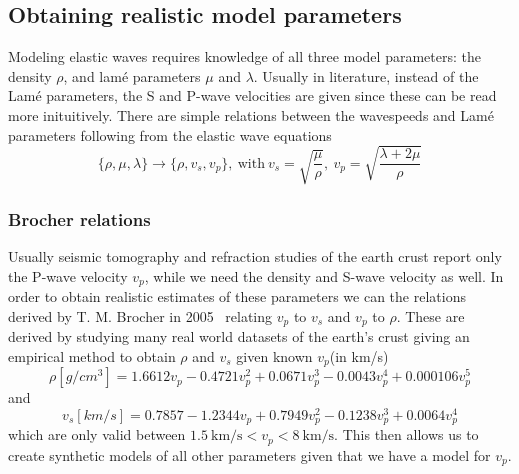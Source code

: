 \documentclass[10pt]{SelfArx} %
\theoremstyle{definition}
\begin{document}
\subsection{Obtaining realistic model parameters}
Modeling elastic waves requires knowledge of all three model parameters: the density $\rho$, and lamé parameters $\mu$ and $\lambda$.
Usually in literature, instead of the Lamé parameters, the S and P-wave velocities are given since these can be read more inituitively. There are simple relations between the wavespeeds and Lamé parameters following from the elastic wave equations 
\begin{equation}\label{eq:conversion_lame_to_velocity}
\{\rho, \mu, \lambda\} \rightarrow \{\rho, v_s, v_p\}, \ \text{with} \ v_s=\sqrt{\frac{\mu}{\rho}}, \ v_p = \sqrt{\frac{\lambda+2\mu}{\rho}} 
\end{equation}
\subsubsection{Brocher relations}
Usually seismic tomography and refraction studies of the earth crust report only the P-wave velocity $v_p$, while we need the density and S-wave velocity as well.
 In order to obtain realistic estimates of these parameters we can the relations derived by T. M. Brocher in 2005~\cite{Brocher2005} relating $v_p$ to $v_s$ and $v_p$ to $\rho$. These are derived by studying many real world datasets of the earth's crust giving an empirical method to obtain $\rho$ and $v_s$ given known $v_p$(in km/s)
\begin{equation}\label{eq:brochers_rho}
\rho[g/cm^3] = 1.6612v_p - 0.4721v_p^2 + 0.0671v_p^3 - 0.0043 v_p^4 + 0.000106 v_p^5
\end{equation}
and 
\begin{equation}\label{eq:brochers_vs}
v_s[km/s] = 0.7857 - 1.2344v_p + 0.7949v_p^2 - 0.1238v_p^3 + 0.0064 v_p^4
\end{equation}
which are only valid between $1.5 \ \text{km/s} < v_p < 8\   \text{km/s}$. This then allows us to create synthetic models of all other parameters given that we have a model for $v_p$.
\end{document}
